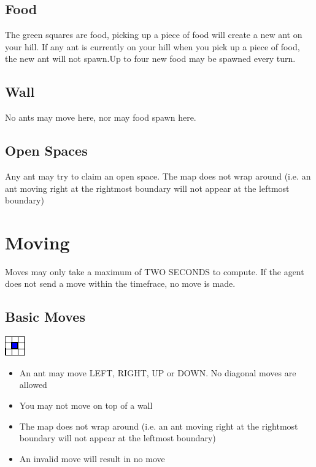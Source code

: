 \documentclass{article}
\begin{document}
\subsection{Food}
The green squares are food, picking up a piece of food will create a new ant on your hill. If any ant is currently on your hill when you pick up a piece of food, the new ant will not spawn.Up to four new food may be spawned every turn.

\subsection{Wall}
No ants may move here, nor may food spawn here.

\subsection{Open Spaces}
Any ant may try to claim an open space. The map does not wrap around (i.e. an ant moving right at the rightmost boundary will not appear at the leftmost boundary)

\newpage
\section{Moving}
Moves may only take a maximum of TWO SECONDS to compute. If the agent does not send a move within the timefrace, no move is made.
\subsection{Basic Moves}
\begin{center}
\includegraphics{basicMove.png}
\end{center}
\begin{itemize}
  \item An ant may move LEFT, RIGHT, UP or DOWN. No diagonal moves are allowed
  \item You may not move on top of a wall
  \item The map does not wrap around (i.e. an ant moving right at the rightmost boundary will not appear at the leftmost boundary)
  \item An invalid move will result in no move
\end{itemize}
\end{document}
